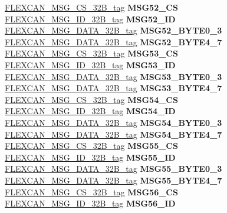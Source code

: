 \begin{DoxyCompactItemize}
\begin{tabbing}
\>\>\mbox{\hyperlink{unionFLEXCAN__MSG__CS__32B__tag}{FLEXCAN\_MSG\_CS\_32B\_tag}} {\bfseries MSG52\_CS}\\
\>\>\mbox{\hyperlink{unionFLEXCAN__MSG__ID__32B__tag}{FLEXCAN\_MSG\_ID\_32B\_tag}} {\bfseries MSG52\_ID}\\
\>\>\mbox{\hyperlink{unionFLEXCAN__MSG__DATA__32B__tag}{FLEXCAN\_MSG\_DATA\_32B\_tag}} {\bfseries MSG52\_BYTE0\_3}\\
\>\>\mbox{\hyperlink{unionFLEXCAN__MSG__DATA__32B__tag}{FLEXCAN\_MSG\_DATA\_32B\_tag}} {\bfseries MSG52\_BYTE4\_7}\\
\>\>\mbox{\hyperlink{unionFLEXCAN__MSG__CS__32B__tag}{FLEXCAN\_MSG\_CS\_32B\_tag}} {\bfseries MSG53\_CS}\\
\>\>\mbox{\hyperlink{unionFLEXCAN__MSG__ID__32B__tag}{FLEXCAN\_MSG\_ID\_32B\_tag}} {\bfseries MSG53\_ID}\\
\>\>\mbox{\hyperlink{unionFLEXCAN__MSG__DATA__32B__tag}{FLEXCAN\_MSG\_DATA\_32B\_tag}} {\bfseries MSG53\_BYTE0\_3}\\
\>\>\mbox{\hyperlink{unionFLEXCAN__MSG__DATA__32B__tag}{FLEXCAN\_MSG\_DATA\_32B\_tag}} {\bfseries MSG53\_BYTE4\_7}\\
\>\>\mbox{\hyperlink{unionFLEXCAN__MSG__CS__32B__tag}{FLEXCAN\_MSG\_CS\_32B\_tag}} {\bfseries MSG54\_CS}\\
\>\>\mbox{\hyperlink{unionFLEXCAN__MSG__ID__32B__tag}{FLEXCAN\_MSG\_ID\_32B\_tag}} {\bfseries MSG54\_ID}\\
\>\>\mbox{\hyperlink{unionFLEXCAN__MSG__DATA__32B__tag}{FLEXCAN\_MSG\_DATA\_32B\_tag}} {\bfseries MSG54\_BYTE0\_3}\\
\>\>\mbox{\hyperlink{unionFLEXCAN__MSG__DATA__32B__tag}{FLEXCAN\_MSG\_DATA\_32B\_tag}} {\bfseries MSG54\_BYTE4\_7}\\
\>\>\mbox{\hyperlink{unionFLEXCAN__MSG__CS__32B__tag}{FLEXCAN\_MSG\_CS\_32B\_tag}} {\bfseries MSG55\_CS}\\
\>\>\mbox{\hyperlink{unionFLEXCAN__MSG__ID__32B__tag}{FLEXCAN\_MSG\_ID\_32B\_tag}} {\bfseries MSG55\_ID}\\
\>\>\mbox{\hyperlink{unionFLEXCAN__MSG__DATA__32B__tag}{FLEXCAN\_MSG\_DATA\_32B\_tag}} {\bfseries MSG55\_BYTE0\_3}\\
\>\>\mbox{\hyperlink{unionFLEXCAN__MSG__DATA__32B__tag}{FLEXCAN\_MSG\_DATA\_32B\_tag}} {\bfseries MSG55\_BYTE4\_7}\\
\>\>\mbox{\hyperlink{unionFLEXCAN__MSG__CS__32B__tag}{FLEXCAN\_MSG\_CS\_32B\_tag}} {\bfseries MSG56\_CS}\\
\>\>\mbox{\hyperlink{unionFLEXCAN__MSG__ID__32B__tag}{FLEXCAN\_MSG\_ID\_32B\_tag}} {\bfseries MSG56\_ID}\\

\end{tabbing}
\end{DoxyCompactItemize}
